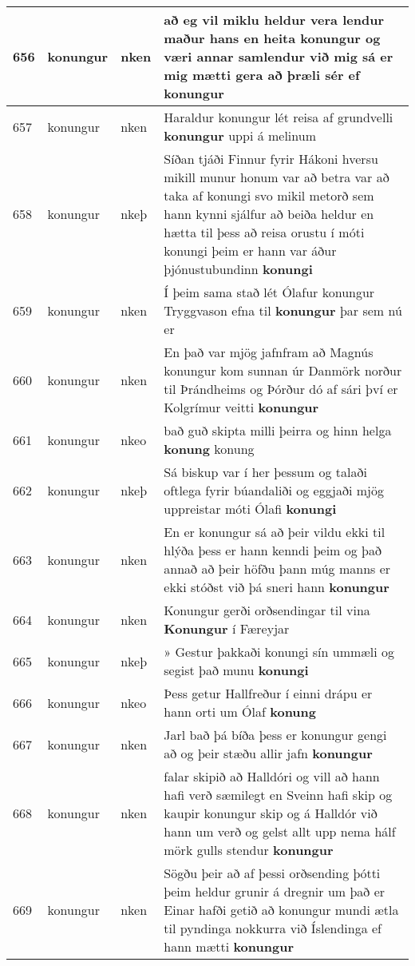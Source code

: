 \documentclass{article}
\begin{document}
\begin{longtable}{p{1cm}|p{1cm}|p{1cm}|p{13cm}}
\hline
656&konungur&nken&að eg vil miklu heldur vera lendur maður hans en heita konungur og væri annar samlendur við mig sá er mig mætti gera að þræli sér ef \textbf{konungur} \\
\hline
657&konungur&nken&Haraldur konungur lét reisa af grundvelli \textbf{konungur} uppi á melinum\\
\hline
658&konungur&nkeþ&Síðan tjáði Finnur fyrir Hákoni hversu mikill munur honum var að betra var að taka af konungi svo mikil metorð sem hann kynni sjálfur að beiða heldur en hætta til þess að reisa orustu í móti konungi þeim er hann var áður þjónustubundinn \textbf{konungi} \\
\hline
659&konungur&nken&Í þeim sama stað lét Ólafur konungur Tryggvason efna til \textbf{konungur} þar sem nú er\\
\hline
660&konungur&nken&En það var mjög jafnfram að Magnús konungur kom sunnan úr Danmörk norður til Þrándheims og Þórður dó af sári því er Kolgrímur veitti \textbf{konungur} \\
\hline
661&konungur&nkeo&bað guð skipta milli þeirra og hinn helga \textbf{konung} konung\\
\hline
662&konungur&nkeþ&Sá biskup var í her þessum og talaði oftlega fyrir búandaliði og eggjaði mjög uppreistar móti Ólafi \textbf{konungi} \\
\hline
663&konungur&nken&En er konungur sá að þeir vildu ekki til hlýða þess er hann kenndi þeim og það annað að þeir höfðu þann múg manns er ekki stóðst við þá sneri hann \textbf{konungur} \\
\hline
664&konungur&nken&Konungur gerði orðsendingar til vina \textbf{Konungur} í Færeyjar\\
\hline
665&konungur&nkeþ&» Gestur þakkaði konungi sín ummæli og segist það munu \textbf{konungi} \\
\hline
666&konungur&nkeo&Þess getur Hallfreður í einni drápu er hann orti um Ólaf \textbf{konung} \\
\hline
667&konungur&nken&Jarl bað þá bíða þess er konungur gengi að og þeir stæðu allir jafn \textbf{konungur} \\
\hline
668&konungur&nken&falar skipið að Halldóri og vill að hann hafi verð sæmilegt en Sveinn hafi skip og kaupir konungur skip og á Halldór við hann um verð og gelst allt upp nema hálf mörk gulls stendur \textbf{konungur} \\
\hline
669&konungur&nken&Sögðu þeir að af þessi orðsending þótti þeim heldur grunir á dregnir um það er Einar hafði getið að konungur mundi ætla til pyndinga nokkurra við Íslendinga ef hann mætti \textbf{konungur} \\

\end{longtable}
\end{document}
